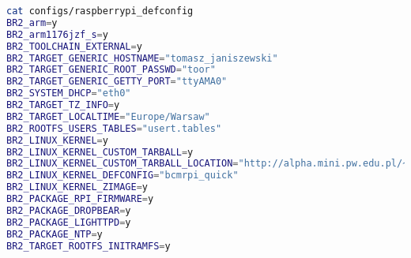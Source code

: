 \begin{lstlisting}[language=bash]
cat configs/raspberrypi_defconfig 
BR2_arm=y
BR2_arm1176jzf_s=y
BR2_TOOLCHAIN_EXTERNAL=y
BR2_TARGET_GENERIC_HOSTNAME="tomasz_janiszewski"
BR2_TARGET_GENERIC_ROOT_PASSWD="toor"
BR2_TARGET_GENERIC_GETTY_PORT="ttyAMA0"
BR2_SYSTEM_DHCP="eth0"
BR2_TARGET_TZ_INFO=y
BR2_TARGET_LOCALTIME="Europe/Warsaw"
BR2_ROOTFS_USERS_TABLES="usert.tables"
BR2_LINUX_KERNEL=y
BR2_LINUX_KERNEL_CUSTOM_TARBALL=y
BR2_LINUX_KERNEL_CUSTOM_TARBALL_LOCATION="http://alpha.mini.pw.edu.pl/~zabolotnyw/linux-c256eb9968c8997dce47350d2075e42f1b3991d3.tar.gz"
BR2_LINUX_KERNEL_DEFCONFIG="bcmrpi_quick"
BR2_LINUX_KERNEL_ZIMAGE=y
BR2_PACKAGE_RPI_FIRMWARE=y
BR2_PACKAGE_DROPBEAR=y
BR2_PACKAGE_LIGHTTPD=y
BR2_PACKAGE_NTP=y
BR2_TARGET_ROOTFS_INITRAMFS=y
\end{lstlisting}	





